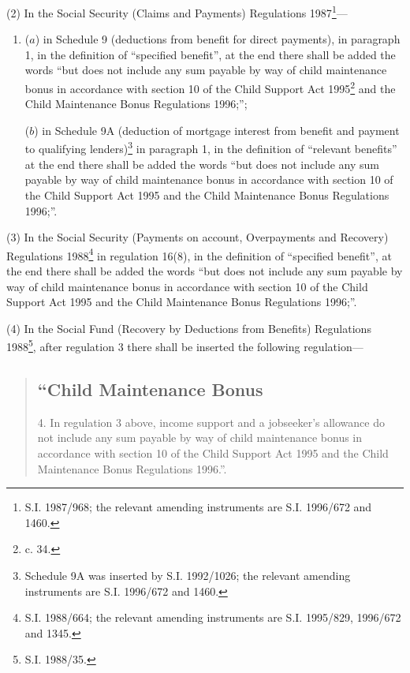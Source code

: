 \documentclass[a4paper]{article}
\begin{document}
(2) In the Social Security (Claims and Payments) Regulations 1987\footnote{\frenchspacing S.I. 1987/968; the relevant amending instruments are S.I. 1996/672 and 1460.}—
\begin{enumerate}\item[]
($a$) in Schedule 9 (deductions from benefit for direct payments), in paragraph 1, in the definition of “specified benefit”, at the end there shall be added the words “but does not include any sum payable by way of child maintenance bonus in accordance with section 10 of the Child Support Act 1995\footnote{ c. 34.} and the Child Maintenance Bonus Regulations 1996;”;

($b$) in Schedule 9A (deduction of mortgage interest from benefit and payment to qualifying lenders)\footnote{\frenchspacing Schedule 9A was inserted by S.I. 1992/1026; the relevant amending instruments are S.I. 1996/672 and 1460.} in paragraph 1, in the definition of “relevant benefits” at the end there shall be added the words “but does not include any sum payable by way of child maintenance bonus in accordance with section 10 of the Child Support Act 1995 and the Child Maintenance Bonus Regulations 1996;”.
\end{enumerate}

(3) In the Social Security (Payments on account, Overpayments and Recovery) Regulations 1988\footnote{\frenchspacing S.I. 1988/664; the relevant amending instruments are S.I. 1995/829, 1996/672 and 1345.} in regulation 16(8), in the definition of “specified benefit”, at the end there shall be added the words “but does not include any sum payable by way of child maintenance bonus in accordance with section 10 of the Child Support Act 1995 and the Child Maintenance Bonus Regulations 1996;”.

(4) In the Social Fund (Recovery by Deductions from Benefits) Regulations 1988\footnote{\frenchspacing S.I. 1988/35.}, after regulation 3 there shall be inserted the following regulation—
\begin{quotation}
\subsection*{“Child Maintenance Bonus}

4.  In regulation 3 above, income support and a jobseeker’s allowance do not include any sum payable by way of child maintenance bonus in accordance with section 10 of the Child Support Act 1995 and the Child Maintenance Bonus Regulations 1996.”.
\end{quotation}
\end{document}

